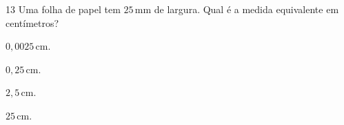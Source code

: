 

\num{13} Uma folha de papel tem $25\,\text{mm}$ de largura. Qual é a medida equivalente
em centímetros?

\begin{escolha}
\item $0,0025\,\text{cm}$.
\item $0,25\,\text{cm}$.
\item $2,5\,\text{cm}$.
\item $25\,\text{cm}$.
\end{escolha}



